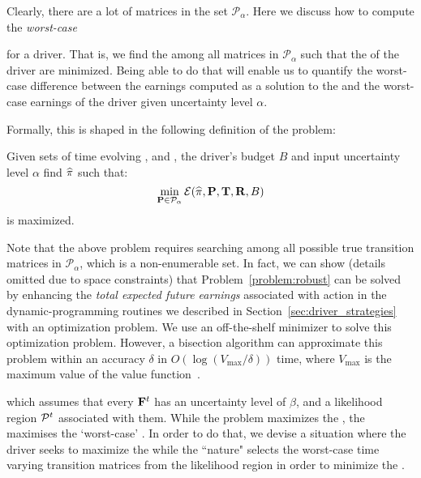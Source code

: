 Clearly, there are a lot of matrices in the set $\mathcal{P}_\alpha$.
Here we discuss how to compute the \emph{worst-case}{ {\totalexpectedearnings} for a driver. That is, we find the {\truetransitionmatrix} among all matrices in $\mathcal{P}_\alpha$ such that the {\totalexpectedearnings} of the driver
are minimized. Being able to do that will enable us to 
quantify the worst-case difference between the earnings computed
as a solution to the {\originalproblem} and the worst-case earnings of the
driver given uncertainty level $\alpha$.


Formally, this is shaped in the following definition of the {\robustproblem}
problem:

\begin{problem}[{\robustproblem}]\label{problem:robust}
Given sets of time evolving {\empiricaltransitionmatrix}, {\traveltimematrix} and {\rewardsmatrix}, the driver's budget $B$ and input uncertainty level $\alpha$
find $\widehat{\pi}$
such that:
\[
\min_{{\mathbf{P}}\in\mathcal{P}_\alpha}\mathcal{E}(\widehat{\pi},{\mathbf{P}},{\mathbf{T}},{\mathbf{R}},B)
\]
is maximized.
\end{problem}
Note that the above problem requires searching among all possible true transition 
matrices in $\mathcal{P}_\alpha$, which is a non-enumerable set. 
In fact, we can show (details omitted due to space constraints) that 
Problem~\ref{problem:robust} can be solved by enhancing the \emph{total expected future earnings} associated with {\getpassenger} action in the  dynamic-programming routines we described in Section~\ref{sec:driver_strategies}
with an optimization problem. We use an off-the-shelf minimizer to solve this optimization problem. However, a bisection algorithm can approximate this problem within an accuracy $\delta$ in $O(\log(V_{\max}/\delta))$ time, where $V_{\max}$ is the maximum value of the value function~\cite{nilim2004robustness}.

\iffalse
which assumes that every ${{\mathbf{F}}}^t$ has an uncertainty level of $\beta$, and a likelihood region $\mathcal{P}^t$ associated with them. While the {\originalproblem} problem maximizes the {\totalexpectedearnings}, the {\nominalproblem} maximises the `worst-case' {\totalexpectedearnings}. In order to do that, we devise a situation where the driver seeks to maximize the {\totalexpectedearnings} 
while the ``nature" selects the worst-case time varying transition matrices from the likelihood region {\likelihoodregion} in order to minimize the {\totalexpectedearnings}.

}
